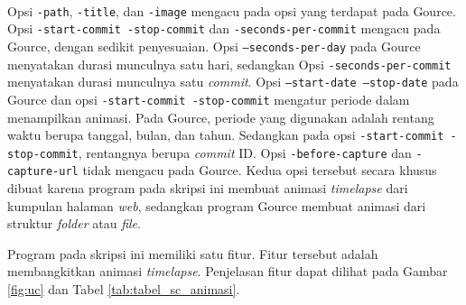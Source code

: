 \ \\
Opsi \texttt{-path}, \texttt{-title}, dan \texttt{-image} mengacu pada opsi yang terdapat pada Gource. Opsi \texttt{-start-commit -stop-commit} dan \texttt{-seconds-per-commit} mengacu pada Gource, dengan sedikit penyesuaian.  Opsi \texttt{--seconds-per-day} pada Gource menyatakan durasi munculnya satu hari, sedangkan Opsi \texttt{-seconds-per-commit} menyatakan durasi munculnya satu \textit{commit}. Opsi \texttt{--start-date --stop-date} pada Gource dan opsi \texttt{-start-commit -stop-commit} mengatur periode dalam menampilkan animasi. Pada Gource, periode yang digunakan adalah rentang waktu berupa tanggal, bulan, dan tahun. Sedangkan pada opsi \texttt{-start-commit -stop-commit}, rentangnya berupa \textit{commit} ID. Opsi \texttt{-before-capture} dan \texttt{-capture-url} tidak mengacu pada Gource. Kedua opsi tersebut secara khusus dibuat karena program pada skripsi ini membuat animasi \textit{timelapse} dari kumpulan halaman \textit{web}, sedangkan program Gource membuat animasi dari struktur \textit{folder} atau \textit{file}.           
  
 
Program pada skripsi ini memiliki satu fitur. Fitur tersebut adalah membangkitkan animasi \textit{timelapse}.
Penjelasan fitur dapat dilihat pada Gambar \ref{fig:uc} dan Tabel \ref{tab:tabel_sc_animasi}.


